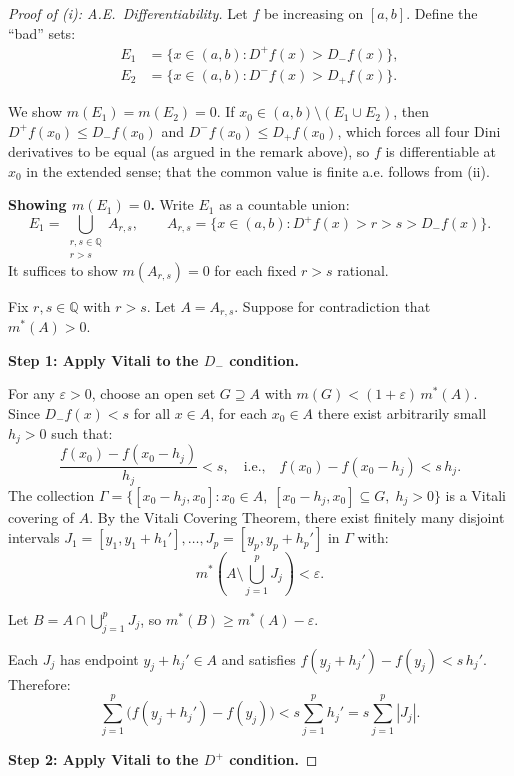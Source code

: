 \documentclass[11pt]{report}
\begin{document}
\begin{proof}[Proof of (i): A.E.\ Differentiability]
Let $f$ be increasing on $[a, b]$. Define the ``bad'' sets:
\begin{align*}
E_1 &= \{x \in (a, b) : D^+ f(x) > D_- f(x)\}, \\
E_2 &= \{x \in (a, b) : D^- f(x) > D_+ f(x)\}.
\end{align*}

We show $m(E_1) = m(E_2) = 0$. If $x_0 \in (a, b) \setminus (E_1 \cup E_2)$, then $D^+ f(x_0) \leq D_- f(x_0)$ and $D^- f(x_0) \leq D_+ f(x_0)$, which forces all four Dini derivatives to be equal (as argued in the remark above), so $f$ is differentiable at $x_0$ in the extended sense; that the common value is finite a.e. follows from (ii).

\textbf{Showing $m(E_1) = 0$.} Write $E_1$ as a countable union:
\[
E_1 = \bigcup_{\substack{r, s \in \mathbb{Q} \\ r > s}} A_{r,s}, \qquad A_{r,s} = \{x \in (a, b) : D^+ f(x) > r > s > D_- f(x)\}.
\]
It suffices to show $m(A_{r,s}) = 0$ for each fixed $r > s$ rational.

Fix $r, s \in \mathbb{Q}$ with $r > s$. Let $A = A_{r,s}$. Suppose for contradiction that $m^*(A) > 0$.

\textbf{Step 1: Apply Vitali to the $D_-$ condition.}

For any $\varepsilon > 0$, choose an open set $G \supseteq A$ with $m(G) < (1 + \varepsilon)\,m^*(A)$. Since $D_- f(x) < s$ for all $x \in A$, for each $x_0 \in A$ there exist arbitrarily small $h_j > 0$ such that:
\[
\frac{f(x_0) - f(x_0 - h_j)}{h_j} < s, \quad \text{i.e.,} \quad f(x_0) - f(x_0 - h_j) < s\,h_j.
\]
The collection $\Gamma = \{[x_0 - h_j, x_0] : x_0 \in A,\; [x_0 - h_j, x_0] \subseteq G,\; h_j > 0\}$ is a Vitali covering of $A$. By the Vitali Covering Theorem, there exist finitely many disjoint intervals $J_1 = [y_1, y_1 + h_1'], \ldots, J_p = [y_p, y_p + h_p']$ in $\Gamma$ with:
\[
m^*\!\left(A \setminus \bigcup_{j=1}^{p} J_j\right) < \varepsilon.
\]

Let $B = A \cap \bigcup_{j=1}^{p} J_j$, so $m^*(B) \geq m^*(A) - \varepsilon$.

Each $J_j$ has endpoint $y_j + h_j' \in A$ and satisfies $f(y_j + h_j') - f(y_j) < s\,h_j'$. Therefore:
\[
\sum_{j=1}^{p} \bigl(f(y_j + h_j') - f(y_j)\bigr) < s \sum_{j=1}^{p} h_j' = s \sum_{j=1}^{p} |J_j|.  \tag{$*$}
\]

\textbf{Step 2: Apply Vitali to the $D^+$ condition.}


\end{proof}
\end{document}
